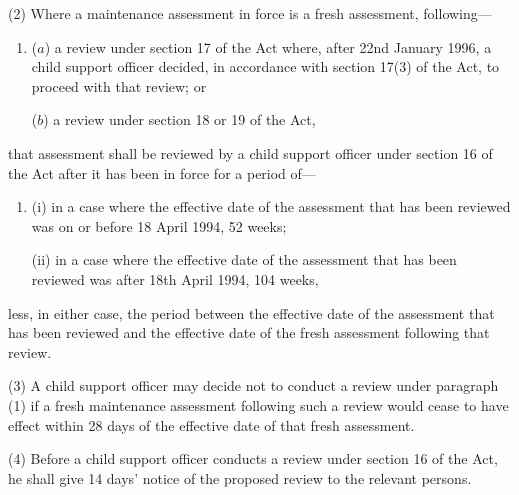 \documentclass[a4paper]{article}
\begin{document}
%

(2) Where a maintenance assessment in force is a fresh assessment, following—
\begin{enumerate}\item[]
($a$) a review under section 17 of the Act where, after 22nd January 1996, a child support officer decided, in accordance with section 17(3) of the Act, to proceed with that review; or

($b$) a review under section 18 or 19 of the Act,
\end{enumerate}
that assessment shall be reviewed by a child support officer under section 16 of the Act after it has been in force for a period of—
\begin{enumerate}\item[]
(i) in a case where the effective date of the assessment that has been reviewed was on or before 18 April 1994, 52 weeks;

(ii) in a case where the effective date of the assessment that has been reviewed was after 18th April 1994, 104 weeks,
\end{enumerate}
less, in either case, the period between the effective date of the assessment that has been reviewed and the effective date of the fresh assessment following that review.

(3) A child support officer may decide not to conduct a review under paragraph (1) if a fresh maintenance assessment following such a review would cease to have effect within 28 days of the effective date of that fresh assessment.

(4) Before a child support officer conducts a review under section 16 of the Act, he shall give 14 days' notice of the proposed review to the relevant persons.
\end{document}
